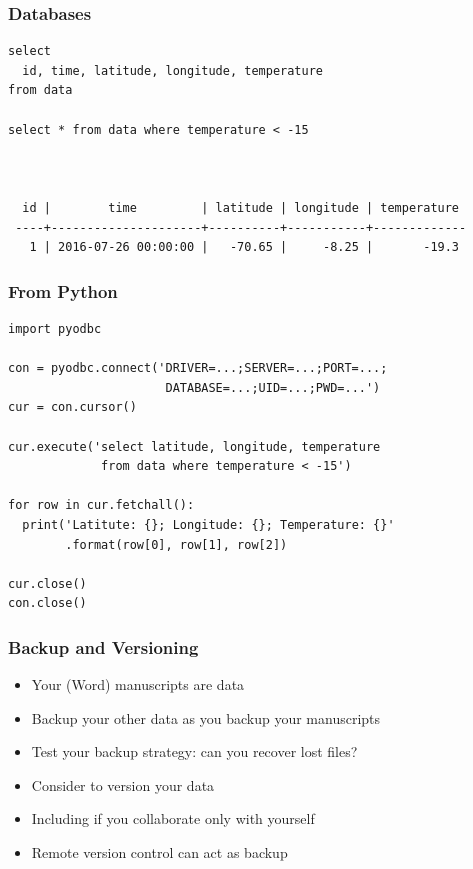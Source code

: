\documentclass{beamer}
\begin{document}
\begin{frame}[fragile]
  \frametitle{Databases}
  
  \small
  \begin{verbatim}
select 
  id, time, latitude, longitude, temperature
from data
  
select * from data where temperature < -15
  
  
  
  id |        time         | latitude | longitude | temperature 
 ----+---------------------+----------+-----------+-------------
   1 | 2016-07-26 00:00:00 |   -70.65 |     -8.25 |       -19.3 
  \end{verbatim}
\end{frame}

\begin{frame}[fragile]
  \frametitle{From Python}
  
  \small
  \begin{verbatim}
import pyodbc

con = pyodbc.connect('DRIVER=...;SERVER=...;PORT=...;
                      DATABASE=...;UID=...;PWD=...')
cur = con.cursor()

cur.execute('select latitude, longitude, temperature 
             from data where temperature < -15')

for row in cur.fetchall():
  print('Latitute: {}; Longitude: {}; Temperature: {}'
        .format(row[0], row[1], row[2])

cur.close()
con.close()
  \end{verbatim}
\end{frame}

\begin{frame}
  \frametitle{Backup and Versioning}
  
  \begin{itemize}
  \item Your (Word) manuscripts are data
  \item Backup your other data as you backup your manuscripts
  \item Test your backup strategy: can you recover lost files?
  \item Consider to version your data
  \item Including if you collaborate only with yourself
  \item Remote version control can act as backup
  \end{itemize}
\end{frame}
\end{document}
